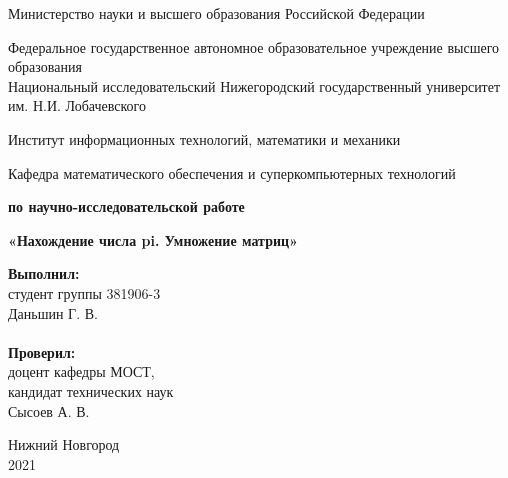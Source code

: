 \documentclass{report}
\begin{document}
\begin{titlepage}
\begin{center}
Министерство науки и высшего образования Российской Федерации
\end{center}
\begin{center}
Федеральное государственное автономное образовательное учреждение высшего образования \\
Национальный исследовательский Нижегородский государственный университет им. Н.И. Лобачевского
\end{center}
\begin{center}
Институт информационных технологий, математики и механики
\end{center}
\begin{center}
Кафедра математического обеспечения и суперкомпьютерных технологий
\end{center}
\vspace{4em}
\begin{center}
\textbf{ по научно-исследовательской работе} \\
\end{center}
\begin{center}
\textbf{\Large«Нахождение числа pi. Умножение матриц»} \\
\end{center}
\vspace{4em}
\newbox{\lbox}
\newlength{\maxl}
\setlength{\maxl}{\wd\lbox}
\hfill\parbox{7cm}{
\hspace*{5cm}\hspace*{-5cm}\textbf{Выполнил:} \\ студент группы 381906-3 \\ Даньшин Г. В. \\ \\
\hspace*{5cm}\hspace*{-5cm}\textbf{Проверил:}\\ доцент кафедры МОСТ, \\ кандидат технических наук \\ Сысоев А. В.\\
}
\vspace{\fill}
\begin{center} Нижний Новгород \\ 2021 \end{center}
\end{titlepage}

\tableofcontents
\clearpage
\end{document}
